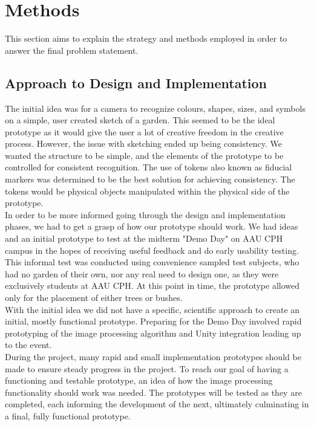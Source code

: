 \chapter{Methods}
This section aims to explain the strategy and methods employed in order to answer the final problem statement. 

\section{Approach to Design and Implementation}

The initial idea was for a camera to recognize colours, shapes, sizes, and symbols on a simple, user created sketch of a garden. This seemed to be the ideal prototype as it would give the user a lot of creative freedom in the creative process. However, the issue with sketching ended up being consistency. We wanted the structure to be simple, and the elements of the prototype to be controlled for consistent recognition. The use of tokens also known as fiducial markers was determined to be the best solution for achieving consistency. The tokens would be physical objects manipulated within the physical side of the prototype.\\

In order to be more informed going through the design and implementation phases, we had to get a grasp of how our prototype should work. We had ideas and an initial prototype to test at the midterm "Demo Day" on AAU CPH campus in the hopes of receiving useful feedback and do early usability testing. This informal test was conducted using convenience sampled test subjects, who had no garden of their own, nor any real need to design one, as they were exclusively students at AAU CPH. At this point in time, the prototype allowed only for the placement of either trees or bushes.\\

With the initial idea we did not have a specific, scientific approach to create an initial, mostly functional prototype. Preparing for the Demo Day involved rapid prototyping of the image processing algorithm and Unity integration leading up to the event.\\

During the project, many rapid and small implementation prototypes should be made to ensure steady progress in the project.
To reach our goal of having a functioning and testable prototype, an idea of how the image processing functionality should work was needed. The prototypes will be tested as they are completed, each informing the development of the next, ultimately culminating in a final, fully functional prototype.\\

